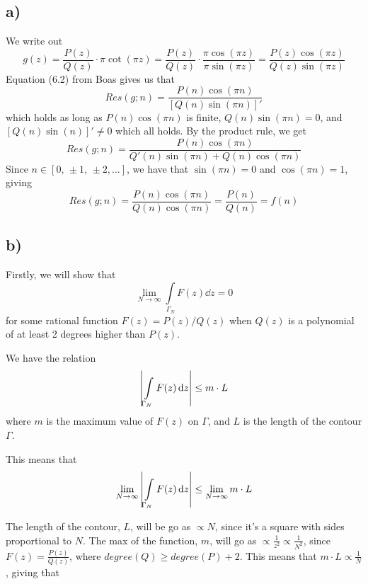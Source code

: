 \documentclass[10pt,a4paper]{article}
\newcommand{\limN}{\lim_{N\rightarrow \infty}}
\newcommand{\Gammaint}{\int\limits_{\Gamma_N}}
\begin{document}
\subsection*{a)}
We write out
\begin{equation}
    g(z) = \frac{P(z)}{Q(z)}\cdot \pi \cot(\pi z) = \frac{P(z)}{Q(z)}\cdot \frac{\pi \cos(\pi z)}{\pi \sin(\pi z)} = \frac{P(z) \cos(\pi z)}{Q(z) \sin(\pi z)}
\end{equation}
Equation (6.2) from Boas gives us that
\begin{equation}
    Res(g;n) = \frac{P(n) \cos(\pi n)}{[Q(n) \sin(\pi n)]'} 
\end{equation}
which holds as long as $P(n)\cos(\pi n)$ is finite, $Q(n)\sin(\pi n) = 0$, and $[Q(n)\sin(n)]' \neq 0$ which all holds. By the product rule, we get
\begin{equation}
    Res(g;n) = \frac{P(n) \cos(\pi n)}{Q'(n) \sin(\pi n) + Q(n) \cos(\pi n)} 
\end{equation}
Since $n\in[0,\, \pm 1,\, \pm 2,...]$, we have that $\sin(\pi n) = 0$ and $\cos(\pi n) = 1$, giving
\begin{equation}
    Res(g;n) = \frac{P(n) \cos(\pi n)}{Q(n) \cos(\pi n)} = \frac{P(n)}{Q(n)} = f(n)
\end{equation}




\subsection*{b)}
Firstly, we will show that
\begin{equation}\label{eqn:task2b}
    \limN \Gammaint F(z) \dd{z} = 0
\end{equation}
for some rational function $F(z) = P(z)/Q(z)$ when $Q(z)$ is a polynomial of at least 2 degrees higher than $P(z)$.

We have the relation
\begin{equation}
    \qty|\Gammaint F(z) \dd{z}| \leq m\cdot L
\end{equation}
where $m$ is the maximum value of $F(z)$ on $\Gamma$, and $L$ is the length of the contour $\Gamma$.

This means that 
\begin{equation}
    \limN \qty|\Gammaint F(z) \dd{z}| \leq \limN m\cdot L
\end{equation}

The length of the contour, $L$, will be go as $\propto N$, since it's a square with sides proportional to $N$. The max of the function, $m$, will go as $\propto\frac{1}{z^2} \propto \frac{1}{N^2}$, since $F(z) = \frac{P(z)}{Q(z)}$, where $degree(Q) \geq degree(P) + 2$. This means that $m\cdot L \propto \frac{1}{N}$, giving that
\end{document}
